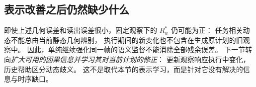 \subsection{表示改善之后仍然缺少什么}
即使上述几何误差和读出误差很小，固定观察下的 $R_w^*$ 仍可能为正：
任务相关动态不能总由当前静态几何辨别，
执行期间的新变化也不包含在生成原计划的旧观察中。
因此，单纯继续强化同一帧的语义监督不能消除全部残余误差。
下一节转向\emph{扩大可用的因果信息并学习其对当前计划的修正}：
更新观察响应执行中变化，历史帮助区分动态歧义。
这不是取代本节的表示学习，而是针对它没有解决的信息与时序缺口。
